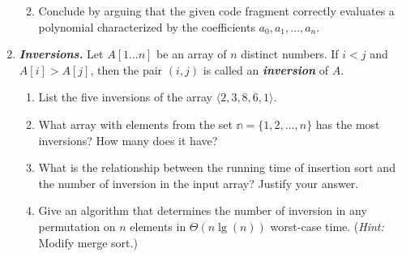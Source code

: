 \documentclass[Chapter02]{subfiles}
\begin{document}
\begin{enumerate}[leftmargin=\labelsep,label={\textbf{\thesection-\arabic*}}]
\begin{enumerate}
\begin{answer}
			\end{answer}
			
			\item Conclude by arguing that the given code fragment correctly evaluates a polynomial characterized by the coefficients $a_0, a_1, \dots, a_n$.
			\begin{answer}
				
			\end{answer}
			
		\end{enumerate}
		
		\item \textbf{\textit{Inversions.}} Let $A[1 \dots n]$ be an array of $n$ distinct numbers. If $i < j$ and $A[i] > A[j]$, then the pair $(i,j)$ is called an \textbf{\textit{inversion}} of $A$.
		\begin{enumerate}
			\item List the five inversions of the array $\langle 2, 3, 8, 6, 1 \rangle$.
			\begin{answer}
				
			\end{answer}

			\item What array with elements from the set $\mathbb{n} = \{1, 2, \dots, n\}$ has the most inversions? How many does it have?
			\begin{answer}
				
			\end{answer}
			
			\item What is the relationship between the running time of insertion sort and the number of inversion in the input array? Justify your answer.
			\begin{answer}
				
			\end{answer}
			
			\item Give an algorithm that determines the number of inversion in any permutation on $n$ elements in $\Theta(n \lg(n))$ worst-case time. (\emph{Hint:} Modify merge sort.)
			\begin{answer}
				
			\end{answer}
			
		\end{enumerate}
		
	\end{enumerate}
\end{document}
